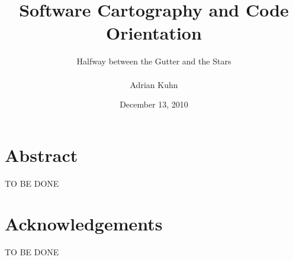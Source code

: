 \documentclass[10pt]{book}
\title{Software Cartography and Code Orientation}
\author{Halfway between the Gutter and the Stars\\~\\Adrian Kuhn}
\date{December 13, 2010}
\begin{document}
\maketitle

\chapter*{Abstract}
TO BE DONE

\chapter*{Acknowledgements}
TO BE DONE

\setcounter{tocdepth}{1}
\tableofcontents






\end{document}
